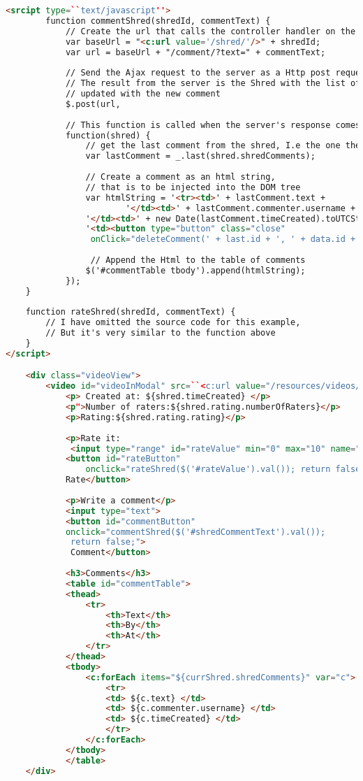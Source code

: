 \begin{lstlisting}[language=html]
	<srcipt type=``text/javascript''>
		function commentShred(shredId, commentText) {
			// Create the url that calls the controller handler on the server
			var baseUrl = "<c:url value='/shred/'/>" + shredId;
			var url = baseUrl + "/comment/?text=" + commentText;
	
			// Send the Ajax request to the server as a Http post request.
			// The result from the server is the Shred with the list of comments 
			// updated with the new comment 
			$.post(url,
			
			// This function is called when the server's response comes back
			function(shred) {				
				// get the last comment from the shred, I.e the one the User just created
				var lastComment = _.last(shred.shredComments); 
				
				// Create a comment as an html string,
				// that is to be injected into the DOM tree
				var htmlString = '<tr><td>' + lastComment.text + 
       			        '</td><td>' + lastComment.commenter.username + 
				'</td><td>' + new Date(lastComment.timeCreated).toUTCString() + '</td>'+
				'<td><button type="button" class="close"
				 onClick="deleteComment(' + last.id + ', ' + data.id + ');" >x</button></td></tr>'
				 
				 // Append the Html to the table of comments
				$('#commentTable tbody').append(htmlString);
			});
	}
	
	function rateShred(shredId, commentText) {
		// I have omitted the source code for this example,
		// But it's very similar to the function above
	}
</script>

	<div class="videoView">
		<video id="videoInModal" src=``<c:url value="/resources/videos/"/>''$										{shred.videoPath''</video>
			<p> Created at: ${shred.timeCreated} </p>
			<p">Number of raters:${shred.rating.numberOfRaters}</p>
			<p>Rating:${shred.rating.rating}</p>
			
			<p>Rate it:
			 <input type="range" id="rateValue" min="0" max="10" name="rating" value="5">
			<button id="rateButton"
				onclick="rateShred($('#rateValue').val()); return false;">
			Rate</button>
			
			<p>Write a comment</p>
			<input type="text">
			<button id="commentButton"
			onclick="commentShred($('#shredCommentText').val());
			 return false;">
			 Comment</button>
			
			<h3>Comments</h3>
			<table id="commentTable">
			<thead>
				<tr>
					<th>Text</th>
					<th>By</th>
					<th>At</th>
				</tr>
			</thead>
			<tbody>
				<c:forEach items="${currShred.shredComments}" var="c">
					<tr>
					<td> ${c.text} </td>
					<td> ${c.commenter.username} </td>
					<td> ${c.timeCreated} </td>
					</tr>
				</c:forEach>
			</tbody>
			</table>
	</div>
\end{lstlisting}

